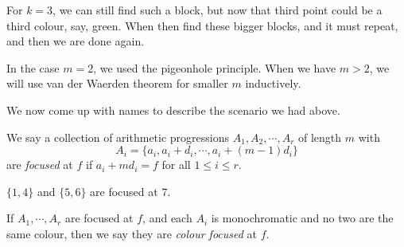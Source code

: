 \documentclass[a4paper]{article}
\begin{document}
For $k = 3$, we can still find such a block, but now that third point could be a third colour, say, green. When then find these bigger blocks, and it must repeat, and then we are done again.

In the case $m = 2$, we used the pigeonhole principle. When we have $m > 2$, we will use van der Waerden theorem for smaller $m$ inductively.

We now come up with names to describe the scenario we had above.
\begin{defi}
  We say a collection of arithmetic progressions $A_1, A_2, \cdots, A_r$ of length $m$ with
  \[
    A_i = \{a_i, a_i + d_i, \cdots, a_i + (m - 1) d_i\}
  \]
  are \emph{focused} at $f$ if $a_i + m d_i = f$ for all $1 \leq i \leq r$.
\end{defi}

\begin{eg}
  $\{1, 4\}$ and $\{5, 6\}$ are focused at $7$.
\end{eg}

\begin{defi}
  If $A_1, \cdots, A_r$ are focused at $f$, and each $A_i$ is monochromatic and no two are the same colour, then we say they are \emph{colour focused} at $f$.
\end{defi}
\end{document}
